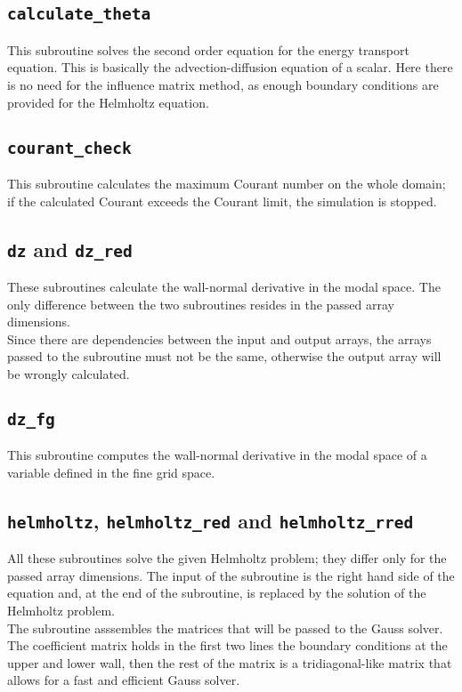 \subsection{\texttt{calculate\_theta}}
This subroutine solves the second order equation for the energy transport equation.
This is basically the advection-diffusion equation of a scalar. 
Here there is no need for the influence matrix method, as enough boundary conditions are provided for the Helmholtz equation.

\subsection{\texttt{courant\_check}}
This subroutine calculates the maximum Courant number on the whole domain; if the calculated Courant exceeds the Courant limit, the simulation is stopped.

\subsection{\texttt{dz} and \texttt{dz\_red}}
These subroutines calculate the wall-normal derivative in the modal space. The only difference between the two subroutines resides in the passed array dimensions.\\
Since there are dependencies between the input and output arrays, the arrays passed to the subroutine must not be the same, otherwise the output array will be wrongly calculated.

\subsection{\texttt{dz\_fg}}
This subroutine computes the wall-normal derivative in the modal space of a variable defined in the fine grid space. 

\subsection{\texttt{helmholtz}, \texttt{helmholtz\_red} and \texttt{helmholtz\_rred}}
All these subroutines solve the given Helmholtz problem; they differ only for the passed array dimensions. The input of the subroutine is the right hand side of the equation and, at the end of the subroutine, is replaced by the solution of the Helmholtz problem.\\
The subroutine asssembles the matrices that will be passed to the Gauss solver. The coefficient matrix holds in the first two lines the boundary conditions at the upper and lower wall, then the rest of the matrix is a tridiagonal-like matrix that allows for a fast and efficient Gauss solver.

